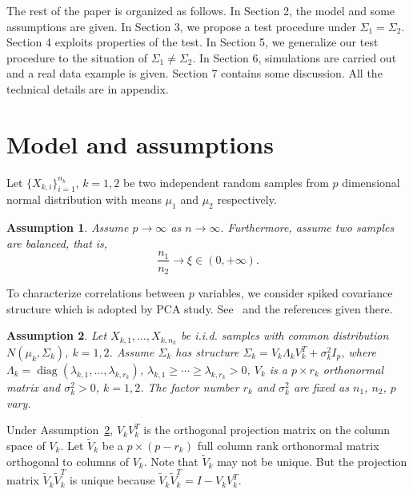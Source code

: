 \documentclass[review]{elsarticle}
\DeclareMathOperator{\mydiag}{diag}
\theoremstyle{plain}
\newtheorem{assumption}{\quad\quad Assumption}
\theoremstyle{definition}
\theoremstyle{remark}
\begin{document}
The rest of the paper is organized as follows. In Section 2,  the model and some assumptions are given.  In Section 3, we propose a test procedure under $\Sigma_1=\Sigma_2$. Section 4 exploits properties of the test. In Section 5, we generalize our test procedure to the situation of $\Sigma_1\neq \Sigma_2$. In Section 6, simulations are carried out and  a real data example is given. Section 7 contains some discussion. All the technical details are in appendix.

\section{Model and assumptions}


Let $\{X_{k,i}\}_{i=1}^{n_k}$, $k=1, 2$ be two independent  random samples from $p$ dimensional normal distribution with means $\mu_1$ and $\mu_2$ respectively.

\begin{assumption}\label{balance}
Assume $p\to \infty$ as $n\to \infty$. Furthermore, assume two samples are balanced, that is,
\begin{equation*}
    \frac{n_1}{n_2}\to \xi \in (0,+\infty).
\end{equation*}
\end{assumption}

To characterize correlations between $p$ variables, we consider spiked covariance structure which is adopted by PCA study. See~\cite{Cai2012Sparse} and the references given there.
\begin{assumption}\label{theModel}
    Let $X_{k,1},\ldots, X_{k, n_k}$  be i.i.d. samples with common distribution $N(\mu_k,\Sigma_k)$, $k=1,2$. 
    Assume $\Sigma_k$ has structure $ 
\Sigma_k=V_k\Lambda_k V_k^T+\sigma^2_k I_p
$, where $\Lambda_k=\mydiag(\lambda_{k,1},\ldots,\lambda_{k,{r_k}})$, 
 $\lambda_{k,1}\geq \cdots \geq \lambda_{k,{r_k}}>0$,
$V_k$ is  a $p\times r_k$ orthonormal matrix and $\sigma^2_k>0$, $k=1,2$. The factor number $r_k$ and $\sigma^2_k$ are fixed as $n_1$, $n_2$, $p$ vary.
\end{assumption}

Under Assumption~\ref{theModel}, $V_k V_k^T$ is the orthogonal projection matrix on the column space of $V_k$. Let $\tilde{V}_k$ be a $p\times (p-r_k)$ full column rank orthonormal matrix orthogonal to columns of  $V_k$.
 Note that $\tilde{V}_k$ may not be unique. But the projection matrix $\tilde{V}_k\tilde{V}_k^T$ is unique because $\tilde{V}_k\tilde{V}_k^T=I-V_k V_k^T$.
\end{document}

